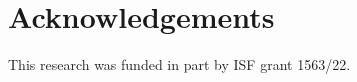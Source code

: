 \documentclass[letterpaper]{article} %
\begin{document}



%
\section*{Acknowledgements}
This research was funded in part by ISF grant 1563/22.


\end{document}
